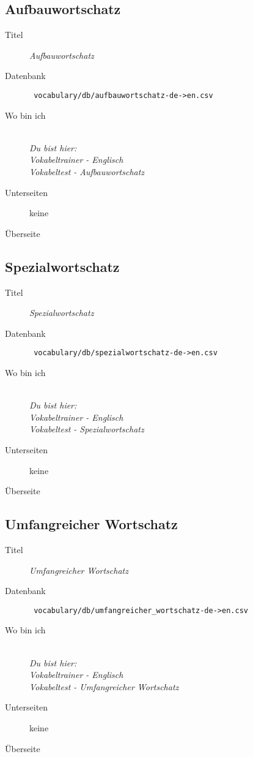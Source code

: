 \subsection{ Aufbauwortschatz }
\label{has:voc-practice-page2}
\begin{description}
	\item[Titel] \emph{ Aufbauwortschatz }
	\item[Datenbank] \texttt{ vocabulary/db/aufbauwortschatz-de->en.csv }
	\item[Wo bin ich] \emph{\\Du bist hier:\\Vokabeltrainer - Englisch\\Vokabeltest - Aufbauwortschatz}
	\item[Unterseiten] keine
	\item[Überseite] 
\end{description}

\subsection{ Spezialwortschatz }
\label{has:voc-practice-page3}
\begin{description}
	\item[Titel] \emph{ Spezialwortschatz }
	\item[Datenbank] \texttt{ vocabulary/db/spezialwortschatz-de->en.csv }
	\item[Wo bin ich] \emph{\\Du bist hier:\\Vokabeltrainer - Englisch\\Vokabeltest - Spezialwortschatz}
	\item[Unterseiten] keine
	\item[Überseite] 
\end{description}

\subsection{ Umfangreicher Wortschatz }
\label{has:voc-practice-page4}
\begin{description}
	\item[Titel] \emph{ Umfangreicher Wortschatz }
	\item[Datenbank] \texttt{ vocabulary/db/umfangreicher\_wortschatz-de->en.csv }
	\item[Wo bin ich] \emph{\\Du bist hier:\\Vokabeltrainer - Englisch\\Vokabeltest - Umfangreicher Wortschatz}
	\item[Unterseiten] keine
	\item[Überseite] 
\end{description}

